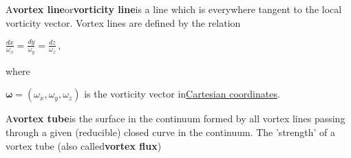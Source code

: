 \usepackage{hyperref}
A\textbf{vortex line}or\textbf{vorticity line}is a line which is everywhere tangent to the local vorticity vector. Vortex lines are defined by the relation


${\displaystyle {\frac {dx}{\omega _{x}}}={\frac {dy}{\omega _{y}}}={\frac {dz}{\omega _{z}}}\,,}$

where

${\displaystyle {\boldsymbol {\omega }}=(\omega _{x},\omega _{y},\omega _{z})}$
is the vorticity vector in\href{https://en.wikipedia.org/wiki/Cartesian_coordinates}{Cartesian coordinates}.


A\textbf{vortex tube}is the surface in the continuum formed by all vortex lines passing through a given (reducible) closed curve in the continuum. The 'strength' of a vortex tube (also called\textbf{vortex flux})
